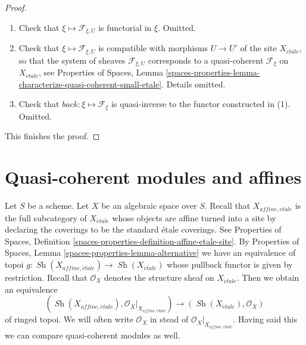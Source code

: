 \documentclass{stacks-project}
\theoremstyle{plain}
\theoremstyle{definition}
\theoremstyle{remark}
\numberwithin{equation}{subsection}
\def\Sh{\mathop{\mathit{Sh}}\nolimits}
\def\etale{{\acute{e}tale}}
\begin{document}
\begin{proof}
\begin{enumerate}
\item Check that $\xi \mapsto \mathcal{F}_{\xi, U}$ is functorial in $\xi$.
Omitted.
\item Check that $\xi \mapsto \mathcal{F}_{\xi, U}$ is compatible
with morphisms $U \to U'$ of the site $X_\etale$, so that
the system of sheaves $\mathcal{F}_{\xi, U}$ corresponds to a quasi-coherent
$\mathcal{F}_\xi$ on $X_\etale$, see
Properties of Spaces,
Lemma \ref{spaces-properties-lemma-characterize-quasi-coherent-small-etale}.
Details omitted.
\item Check that $back : \xi \mapsto \mathcal{F}_\xi$ is quasi-inverse
to the functor constructed in (1). Omitted.
\end{enumerate}
This finishes the proof.
\end{proof}









\section{Quasi-coherent modules and affines}
\label{section-alternative-quasi-coherent}

\noindent
Let $S$ be a scheme. Let $X$ be an algebraic space over $S$.
Recall that $X_{affine, \etale}$ is the full subcategory of $X_\etale$
whose objects are affine turned into a site by declaring the coverings
to be the standard \'etale coverings. See Properties of Spaces, Definition
\ref{spaces-properties-definition-affine-etale-site}.
By Properties of Spaces, Lemma \ref{spaces-properties-lemma-alternative}
we have an equivalence of topoi
$g : \Sh(X_{affine, \etale}) \to \Sh(X_\etale)$
whose pullback functor is given by restriction.
Recall that $\mathcal{O}_X$ denotes the structure sheaf on
$X_\etale$. Then we obtain an equivalence
\begin{equation}
\label{equation-alternative-small-ringed}
(\Sh(X_{affine, \etale}), \mathcal{O}_X|_{X_{affine, \etale}})
\longrightarrow
(\Sh(X_\etale), \mathcal{O}_X)
\end{equation}
of ringed topoi. We will often write $\mathcal{O}_X$
in stead of $\mathcal{O}_X|_{X_{affine, \etale}}$.
Having said this we can compare quasi-coherent modules as well.
\end{document}

